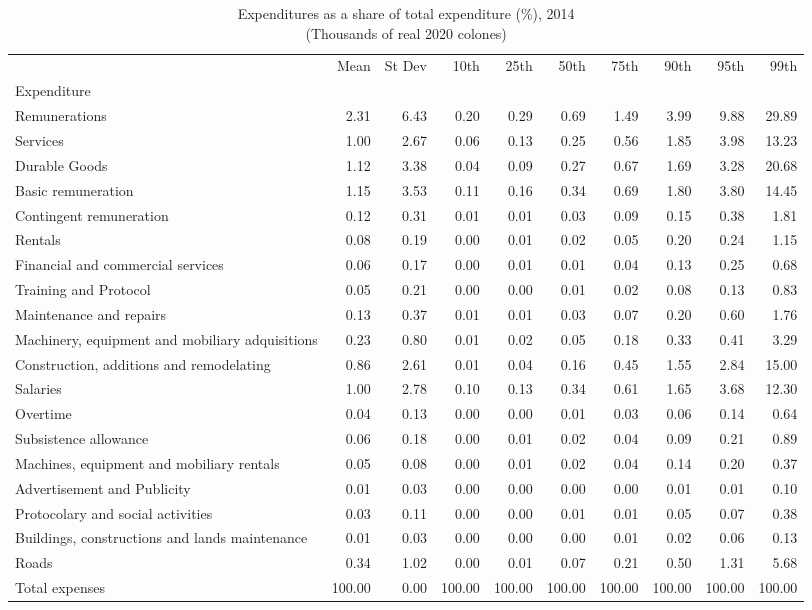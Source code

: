 \begin{table}[h]
\centering
\caption{Expenditures as a share of total expenditure (\%), 2014\\(Thousands of real 2020 colones)}
\begin{tabular}{lrrrrrrrrr}
\toprule
 & Mean & St Dev & 10th & 25th & 50th & 75th & 90th & 95th & 99th \\
Expenditure &  &  &  &  &  &  &  &  &  \\
\midrule
Remunerations & 2.31 & 6.43 & 0.20 & 0.29 & 0.69 & 1.49 & 3.99 & 9.88 & 29.89 \\
Services & 1.00 & 2.67 & 0.06 & 0.13 & 0.25 & 0.56 & 1.85 & 3.98 & 13.23 \\
Durable Goods & 1.12 & 3.38 & 0.04 & 0.09 & 0.27 & 0.67 & 1.69 & 3.28 & 20.68 \\
Basic remuneration & 1.15 & 3.53 & 0.11 & 0.16 & 0.34 & 0.69 & 1.80 & 3.80 & 14.45 \\
Contingent remuneration & 0.12 & 0.31 & 0.01 & 0.01 & 0.03 & 0.09 & 0.15 & 0.38 & 1.81 \\
Rentals & 0.08 & 0.19 & 0.00 & 0.01 & 0.02 & 0.05 & 0.20 & 0.24 & 1.15 \\
Financial and commercial services & 0.06 & 0.17 & 0.00 & 0.01 & 0.01 & 0.04 & 0.13 & 0.25 & 0.68 \\
Training and Protocol & 0.05 & 0.21 & 0.00 & 0.00 & 0.01 & 0.02 & 0.08 & 0.13 & 0.83 \\
Maintenance and repairs & 0.13 & 0.37 & 0.01 & 0.01 & 0.03 & 0.07 & 0.20 & 0.60 & 1.76 \\
Machinery, equipment and mobiliary adquisitions & 0.23 & 0.80 & 0.01 & 0.02 & 0.05 & 0.18 & 0.33 & 0.41 & 3.29 \\
Construction, additions and remodelating & 0.86 & 2.61 & 0.01 & 0.04 & 0.16 & 0.45 & 1.55 & 2.84 & 15.00 \\
Salaries & 1.00 & 2.78 & 0.10 & 0.13 & 0.34 & 0.61 & 1.65 & 3.68 & 12.30 \\
Overtime & 0.04 & 0.13 & 0.00 & 0.00 & 0.01 & 0.03 & 0.06 & 0.14 & 0.64 \\
Subsistence allowance & 0.06 & 0.18 & 0.00 & 0.01 & 0.02 & 0.04 & 0.09 & 0.21 & 0.89 \\
Machines, equipment and mobiliary rentals & 0.05 & 0.08 & 0.00 & 0.01 & 0.02 & 0.04 & 0.14 & 0.20 & 0.37 \\
Advertisement and Publicity & 0.01 & 0.03 & 0.00 & 0.00 & 0.00 & 0.00 & 0.01 & 0.01 & 0.10 \\
Protocolary and social activities & 0.03 & 0.11 & 0.00 & 0.00 & 0.01 & 0.01 & 0.05 & 0.07 & 0.38 \\
Buildings, constructions and lands maintenance & 0.01 & 0.03 & 0.00 & 0.00 & 0.00 & 0.01 & 0.02 & 0.06 & 0.13 \\
Roads & 0.34 & 1.02 & 0.00 & 0.01 & 0.07 & 0.21 & 0.50 & 1.31 & 5.68 \\
Total expenses & 100.00 & 0.00 & 100.00 & 100.00 & 100.00 & 100.00 & 100.00 & 100.00 & 100.00 \\
\bottomrule
\end{tabular}
\end{table}
